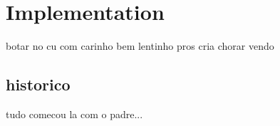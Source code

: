 \chapter{Implementation}

botar no cu com carinho bem lentinho pros cria chorar vendo

\section{historico}

tudo comecou la com o padre...
